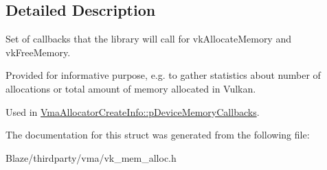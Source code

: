 \subsection{Detailed Description}
Set of callbacks that the library will call for {\ttfamily vk\+Allocate\+Memory} and {\ttfamily vk\+Free\+Memory}. 

Provided for informative purpose, e.\+g. to gather statistics about number of allocations or total amount of memory allocated in Vulkan.

Used in \hyperlink{structVmaAllocatorCreateInfo_af1380969b5e1ea4c3184a877892d260e}{Vma\+Allocator\+Create\+Info\+::p\+Device\+Memory\+Callbacks}. 

The documentation for this struct was generated from the following file\+:\begin{DoxyCompactItemize}
\item 
Blaze/thirdparty/vma/vk\+\_\+mem\+\_\+alloc.\+h\end{DoxyCompactItemize}
